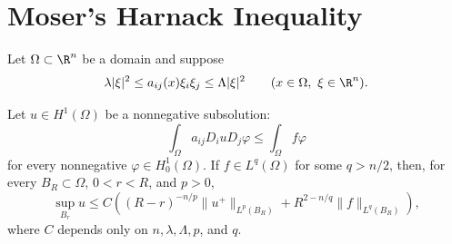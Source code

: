 \section{Moser's Harnack Inequality}

Let $\Omega\subset\R^n$ be a domain and suppose
\[
\lambda|\xi|^2\leq a_{ij}(x)\xi_i\xi_j\leq\Lambda|\xi|^2
\qquad(x\in\Omega,\ \xi\in\R^n).
\]

\begin{theorem}\label{hanlin:weaksol-part2-scaled-local-boundedness}
Let $u\in H^1(\Omega)$ be a nonnegative subsolution:
\[
\int_\Omega a_{ij}D_i uD_j\varphi
\leq\int_\Omega f\varphi
\]
for every nonnegative $\varphi\in H^1_0(\Omega)$. If
$f\in L^q(\Omega)$ for some $q>n/2$, then, for every
$B_R\subset\Omega$, $0<r<R$, and $p>0$,
\[
\sup_{B_r}u
\leq C\left((R-r)^{-n/p}\|u^+\|_{L^p(B_R)}
+R^{2-n/q}\|f\|_{L^q(B_R)}\right),
\]
where $C$ depends only on $n,\lambda,\Lambda,p$, and $q$.
\end{theorem}

